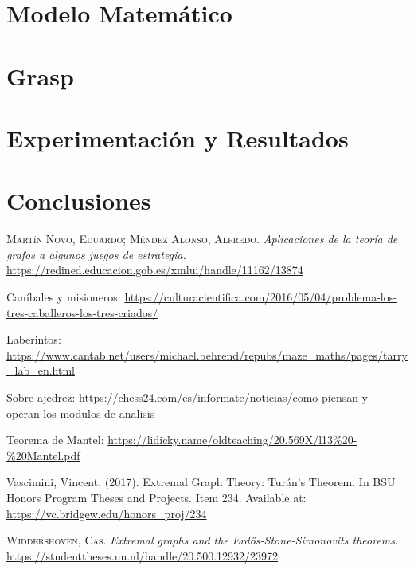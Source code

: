 \documentclass[12pt,a4paper]{book}
\begin{document}
\chapter{Modelo Matemático}


\chapter{Grasp}




\chapter{Experimentación y Resultados}


\chapter{Conclusiones}





\begin{thebibliography}{X}
     \textsc{Martín Novo, Eduardo; Méndez Alonso, Alfredo}.
    \textit{Aplicaciones de la teoría de grafos a algunos juegos de estrategia.}
    \url{https://redined.educacion.gob.es/xmlui/handle/11162/13874}

     Caníbales y misioneros: \url{https://culturacientifica.com/2016/05/04/problema-los-tres-caballeros-los-tres-criados/}

     Laberintos: \url{https://www.cantab.net/users/michael.behrend/repubs/maze_maths/pages/tarry_lab_en.html}
    
     Sobre ajedrez: \url{https://chess24.com/es/informate/noticias/como-piensan-y-operan-los-modulos-de-analisis}

     Teorema de Mantel: \url{https://lidicky.name/oldteaching/20.569X/l13%20-%20Mantel.pdf}

     Vascimini, Vincent. (2017). Extremal Graph Theory: Turán’s Theorem. 
    In BSU Honors Program Theses and Projects. Item 234. Available at: \url{https://vc.bridgew.edu/honors_proj/234}

     \textsc{Widdershoven, Cas.} \textit{Extremal graphs and the Erd{\H{o}}s-Stone-Simonovits theorems.}
    \url{https://studenttheses.uu.nl/handle/20.500.12932/23972}

\end{thebibliography}
\end{document}
